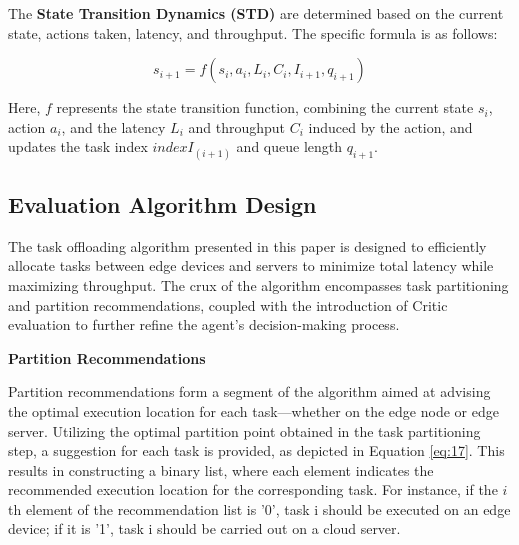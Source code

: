 \documentclass[preprint,12pt]{elsarticle}
\begin{document}
The \textbf{State Transition Dynamics (STD)}  are determined based on the current state, actions taken, latency, and throughput. The specific formula is as follows:

\begin{equation}
        s_{i+1}=f(s_i,a_i,L_i,C_i,I_{i+1},q_{i+1})
    \end{equation}

Here, \(f\) represents the state transition function, combining the current state \(s_i\), action \(a_i\), and the latency \(L_i\) and throughput \(C_i\) induced by the action, and updates the task index \(indexI_(i+1)\) and queue length \(q_{i+1}\).

\subsection{Evaluation Algorithm Design}

The task offloading algorithm presented in this paper is designed to efficiently allocate tasks between edge devices and servers to minimize total latency while maximizing throughput. The crux of the algorithm encompasses task partitioning and partition recommendations, coupled with the introduction of Critic evaluation to further refine the agent's decision-making process.

\textbf{Partition Recommendations}

Partition recommendations form a segment of the algorithm aimed at advising the optimal execution location for each task—whether on the edge node or edge server. Utilizing the optimal partition point obtained in the task partitioning step, a suggestion for each task is provided, as depicted in Equation \ref{eq:17}. This results in constructing a binary list, where each element indicates the recommended execution location for the corresponding task. For instance, if the \(i\)th element of the recommendation list is '0', task i should be executed on an edge device; if it is '1', task i should be carried out on a cloud server.



\end{document}
